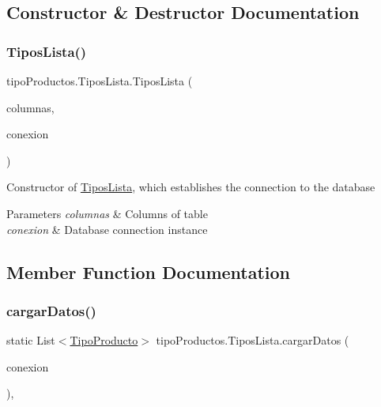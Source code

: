 \subsection{Constructor \& Destructor Documentation}
\mbox{\label{classtipo_productos_1_1_tipos_lista_a75e4a1ac3bcb6d64c3fc5dbae72e85c5}} 
\subsubsection{\texorpdfstring{Tipos\+Lista()}{TiposLista()}}
{\footnotesize\ttfamily tipo\+Productos.\+Tipos\+Lista.\+Tipos\+Lista (\begin{DoxyParamCaption}\item[{\mbox{\hyperlink{classtipo_productos_1_1_modelo_columnas_tabla_tipo_productos}{Modelo\+Columnas\+Tabla\+Tipo\+Productos}}}]{columnas,  }\item[{\mbox{\hyperlink{classconexion_s_q_l_1_1_my_data_access}{My\+Data\+Access}}}]{conexion }\end{DoxyParamCaption})\hspace{0.3cm}{\ttfamily [inline]}}

Constructor of \mbox{\hyperlink{classtipo_productos_1_1_tipos_lista}{Tipos\+Lista}}, which establishes the connection to the database 
\begin{DoxyParams}{Parameters}
{\em columnas} & Columns of table \\
\hline
{\em conexion} & Database connection instance \\
\hline
\end{DoxyParams}


\subsection{Member Function Documentation}
\mbox{\label{classtipo_productos_1_1_tipos_lista_ad36441dd4c32340b0905b5d30b91fcb4}} 
\subsubsection{\texorpdfstring{cargar\+Datos()}{cargarDatos()}}
{\footnotesize\ttfamily static List$<$\mbox{\hyperlink{classtipo_productos_1_1_tipo_producto}{Tipo\+Producto}}$>$ tipo\+Productos.\+Tipos\+Lista.\+cargar\+Datos (\begin{DoxyParamCaption}\item[{\mbox{\hyperlink{classconexion_s_q_l_1_1_my_data_access}{My\+Data\+Access}}}]{conexion }\end{DoxyParamCaption})\hspace{0.3cm}{\ttfamily [inline]}, {\ttfamily [static]}}

